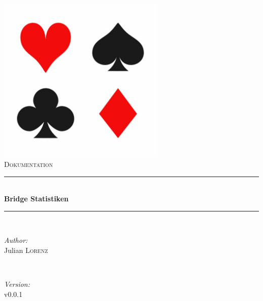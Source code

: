 \begin{titlepage}

\newcommand{\HRule}{\rule{\linewidth}{0.5mm}} %

\center %

\label{Heading}
\includegraphics[width=8cm]{pictures/logo.jpg}\\[1.5cm] %
\textsc{\Large Dokumentation}\\[0.5cm] %

\HRule \\[0.5cm]
{ \huge \bfseries Bridge Statistiken}\\[0.3cm] %
\HRule \\[1.5cm]

\label{Author}
\begin{minipage}{0.4\textwidth}
\begin{flushleft} \large
\emph{Author:}\\
Julian \textsc{Lorenz}
\end{flushleft}
\end{minipage}
~
\begin{minipage}{0.4\textwidth}
\begin{flushright} \large
\emph{Version:} \\
v0.0.1
\end{flushright}
\end{minipage}\\[4cm]



\end{titlepage}
